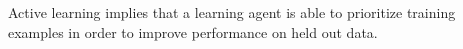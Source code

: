 \documentclass[preview]{standalone}
\begin{document}
\begin{center}
Active learning implies that a learning agent is able to prioritize training examples in order to improve performance on held out data.
\end{center}
\end{document}
